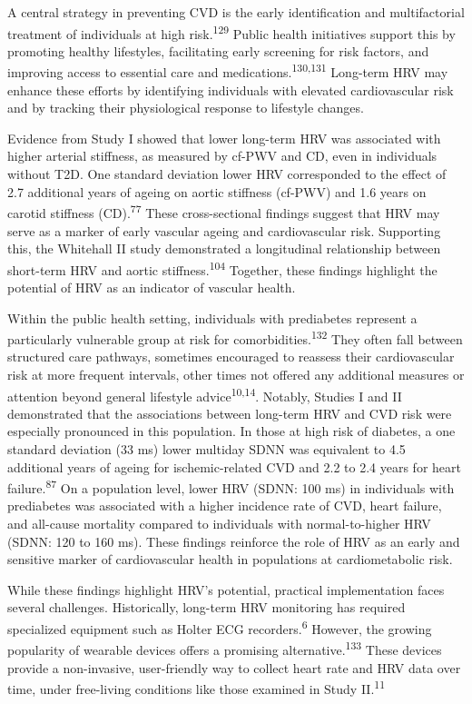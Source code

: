 \documentclass[
  a4paper,
  headsepline=true,
  open=left]{scrbook}
\begin{document}
A central strategy in preventing CVD is the early identification and
multifactorial treatment of individuals at high
risk.\textsuperscript{129} Public health initiatives support this by
promoting healthy lifestyles, facilitating early screening for risk
factors, and improving access to essential care and
medications.\textsuperscript{130,131} Long-term HRV may enhance these
efforts by identifying individuals with elevated cardiovascular risk and
by tracking their physiological response to lifestyle changes.

Evidence from Study I showed that lower long-term HRV was associated
with higher arterial stiffness, as measured by cf-PWV and CD, even in
individuals without T2D. One standard deviation lower HRV corresponded
to the effect of 2.7 additional years of ageing on aortic stiffness
(cf-PWV) and 1.6 years on carotid stiffness (CD).\textsuperscript{77}
These cross-sectional findings suggest that HRV may serve as a marker of
early vascular ageing and cardiovascular risk. Supporting this, the
Whitehall II study demonstrated a longitudinal relationship between
short-term HRV and aortic stiffness.\textsuperscript{104} Together,
these findings highlight the potential of HRV as an indicator of
vascular health.

Within the public health setting, individuals with prediabetes represent
a particularly vulnerable group at risk for
comorbidities.\textsuperscript{132} They often fall between structured
care pathways, sometimes encouraged to reassess their cardiovascular
risk at more frequent intervals, other times not offered any additional
measures or attention beyond general lifestyle
advice\textsuperscript{10,14}. Notably, Studies I and II demonstrated
that the associations between long-term HRV and CVD risk were especially
pronounced in this population. In those at high risk of diabetes, a one
standard deviation (33 ms) lower multiday SDNN was equivalent to 4.5
additional years of ageing for ischemic-related CVD and 2.2 to 2.4 years
for heart failure.\textsuperscript{87} On a population level, lower HRV
(SDNN: 100 ms) in individuals with prediabetes was associated with a
higher incidence rate of CVD, heart failure, and all-cause mortality
compared to individuals with normal-to-higher HRV (SDNN: 120 to 160 ms).
These findings reinforce the role of HRV as an early and sensitive
marker of cardiovascular health in populations at cardiometabolic risk.

While these findings highlight HRV's potential, practical implementation
faces several challenges. Historically, long-term HRV monitoring has
required specialized equipment such as Holter ECG
recorders.\textsuperscript{6} However, the growing popularity of
wearable devices offers a promising alternative.\textsuperscript{133}
These devices provide a non-invasive, user-friendly way to collect heart
rate and HRV data over time, under free-living conditions like those
examined in Study II.\textsuperscript{11}
\end{document}
